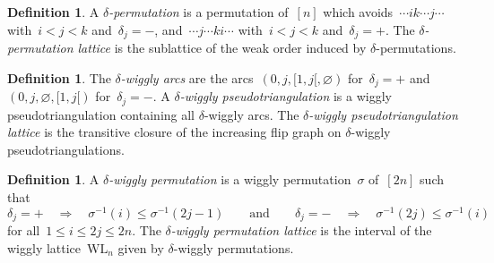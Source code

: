 \documentclass{amsart}
\theoremstyle{definition}
\newtheorem{definition}[theorem]{Definition}
\renewcommand{\implies}{\Rightarrow} %
\newcommand{\darkblue}{\color{darkblue}} %
\newcommand{\defn}[1]{\textsl{\darkblue #1}} %
\newcommand{\wigglyLattice}{\mathrm{WL}} %
\begin{document}
\begin{definition}
\label{def:CambrianPermutations}
A \defn{$\delta$-permutation} is a permutation of~$[n]$ which avoids~$\cdots ik \cdots j \cdots$ with~$i < j < k$ and~$\delta_j = -$, and~$\cdots j \cdots ki \cdots$ with~$i < j < k$ and~$\delta_j = +$.
The \defn{$\delta$-permutation lattice} is the sublattice of the weak order induced by $\delta$-permutations.
\end{definition}

\begin{definition}
\label{def:CambrianWigglyPseudotriangulations}
The \defn{$\delta$-wiggly arcs} are the arcs~$(0, j, {[1,j[}, \varnothing)$ for~$\delta_j = {+}$ and~$(0, j, \varnothing, {[1,j[})$ for~$\delta_j = {-}$.
A \defn{$\delta$-wiggly pseudotriangulation} is a wiggly pseudotriangulation containing all $\delta$-wiggly arcs.
The \defn{$\delta$-wiggly pseudotriangulation lattice} is the transitive closure of the increasing flip graph on $\delta$-wiggly pseudotriangulations.
\end{definition}

\begin{definition}
\label{def:CambrianWigglyPermutations}
A \defn{$\delta$-wiggly permutation} is a wiggly permutation~$\sigma$ of~$[2n]$ such that
\[
\delta_j = {+} \quad \Longrightarrow \quad \sigma^{-1}(i) \le \sigma^{-1}(2j-1)
\qquad\text{and}\qquad
\delta_j = {-} \quad \Longrightarrow \quad \sigma^{-1}(2j) \le \sigma^{-1}(i)
\]
for all~$1 \le i \le 2j \le 2n$.
The \defn{$\delta$-wiggly permutation lattice} is the interval of the wiggly lattice~$\wigglyLattice_n$ given by $\delta$-wiggly permutations.
\end{definition}
\end{document}
